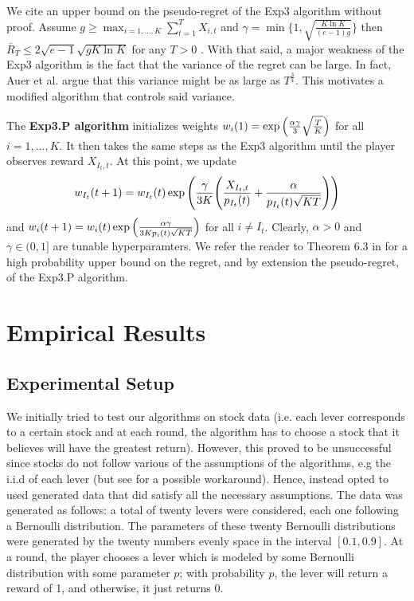 \documentclass[12pt]{article}
\begin{document}
We cite an upper bound on the pseudo-regret of the Exp3 algorithm without proof. Assume $g\geq\max_{i=1,...,K}\sum_{t=1}^{T}X_{i,t}$ and $\gamma=\min\{1,\sqrt{\frac{K\ln K}{(e-1)g}}\}$ then $\bar{R}_{T}\leq 2\sqrt{e-1}\sqrt{gK\ln K}$ for any $T>0$ \cite{auer2003}. With that said, a major weakness of the Exp3 algorithm is the fact that the variance of the regret can be large. In fact, Auer et al. argue that this variance might be as large as $T^{\frac{3}{4}}$. This motivates a modified algorithm that controls said variance.

The \textbf{Exp3.P algorithm} initializes weights $w_{i}(1)=\exp\Big{(}\frac{\alpha\gamma}{3}\sqrt{\frac{T}{K}}\Big{)}$ for all $i=1,...,K$. It then takes the same steps as the Exp3 algorithm until the player observes reward $X_{I_{t},t}$. At this point, we update
\begin{align}
w_{I_{t}}(t+1)=w_{I_{t}}(t)\exp\Bigg{(}\frac{\gamma}{3K}\Bigg{(}\frac{X_{I_{t},t}}{p_{I_{t}}(t)}+\frac{\alpha}{p_{I_{t}}(t)\sqrt{KT}}\Bigg{)}\Bigg{)}
\end{align}
and $w_{i}(t+1)=w_{i}(t)\exp\Big{(}\frac{\alpha\gamma}{3K p_{i}(t)\sqrt{KT}}\Big{)}$ for all $i\neq I_{t}$. Clearly, $\alpha>0$ and $\gamma\in(0,1]$ are tunable hyperparamters. We refer the reader to Theorem 6.3 in \cite{auer2003} for a high probability upper bound on the regret, and by extension the pseudo-regret, of the Exp3.P algorithm.

\section{Empirical Results}

\subsection{Experimental Setup}

We initially tried to test our algorithms on stock data (i.e. each lever corresponds to a certain stock and at each round, the algorithm has to choose a stock that it believes will have the greatest return). However, this proved to be unsuccessful since stocks do not follow various of the assumptions of the algorithms, e.g the i.i.d of each lever (but see \cite{Shen:2015:PCO:2832249.2832384} for a possible workaround). Hence, instead opted to used generated data that did satisfy all the necessary assumptions. The data was generated as follows: a total of twenty levers were considered, each one following a Bernoulli distribution. The parameters of these twenty Bernoulli distributions were generated by the twenty numbers evenly space in the interval $[0.1, 0.9]$. At a round, the player chooses a lever which is modeled by some Bernoulli distribution with some parameter $p$; with probability $p$, the lever will return a reward of 1, and otherwise, it just returns 0.
\end{document}
